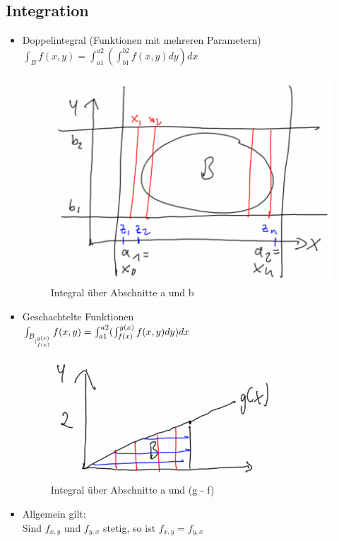 \subsection{Integration}
\begin{itemize}
	\item Doppelintegral (Funktionen mit mehreren Parametern) \\
	$\int_B f(x, y) = \int_{a1}^{a2}(\int_{b1}^{b2} f(x, y) dy) dx$
    \begin{figure}[h!]
        \centering
        \includegraphics[scale=.5]{pics/doppelintegral}
        \caption{Integral über Abschnitte a und b}
    \end{figure}

	\item Geschachtelte Funktionen \\
	$\int_{B_{\arrowvert_{f(x)}^{g(x)}}} f(x, y) = \int_{a1}^{a2}(\int_{f(x)}^{g(x)} f(x, y) dy) dx$
    \begin{figure}[h!]
        \centering
        \includegraphics[scale=.5]{pics/doppelintegralfunktionen}
        \caption{Integral über Abschnitte a und (g - f)}
    \end{figure}

	\item Allgemein gilt: \\
	Sind $f_{x,y}$ und $f_{y,x}$ stetig, so ist $f_{x,y} = f_{y,x}$
\end{itemize}

